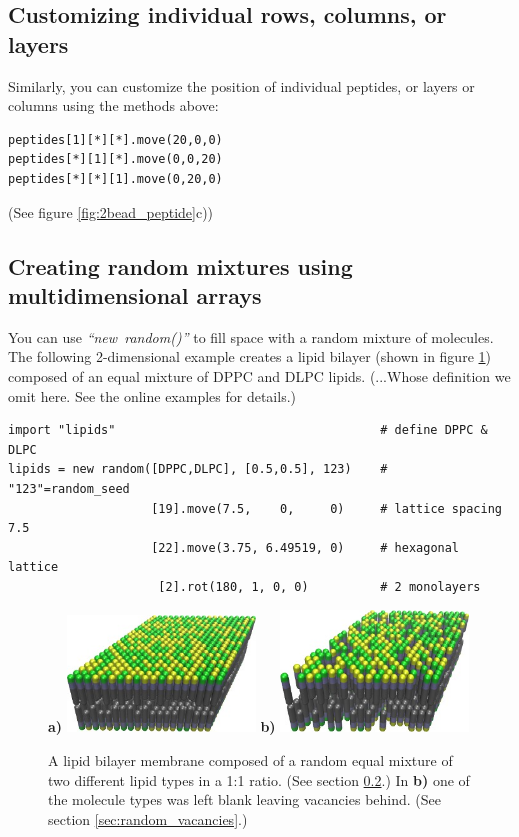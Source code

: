 \documentclass[11pt]{article}
\begin{document}
\subsection{Customizing individual rows, columns, or layers}
Similarly, you can customize the position of individual peptides, 
or layers or columns using the methods above:
\begin{verbatim}
peptides[1][*][*].move(20,0,0)
peptides[*][1][*].move(0,0,20)
peptides[*][*][1].move(0,20,0)
\end{verbatim}
(See figure \ref{fig:2bead_peptide}c))

\subsection{Creating random mixtures using multidimensional arrays}
\label{sec:random_advanced}
You can use \mbox{\textit{``new random()''}} to fill space with
a random mixture of molecules.  The following 2-dimensional example
creates a lipid bilayer (shown in figure \ref{fig:random_bilayer})
composed of an equal mixture of 
DPPC and DLPC lipids. (...Whose definition we omit here.  
See the online examples for details.)
\begin{verbatim}
import "lipids"                                     # define DPPC & DLPC
lipids = new random([DPPC,DLPC], [0.5,0.5], 123)    # "123"=random_seed
                    [19].move(7.5,    0,     0)     # lattice spacing 7.5
                    [22].move(3.75, 6.49519, 0)     # hexagonal lattice
                     [2].rot(180, 1, 0, 0)          # 2 monolayers
\end{verbatim}
\begin{figure}[htbp]
\centering
\textbf{a)}
\includegraphics[width=5cm]{lipid_bilayer_mixture_LR.jpg}
\hspace{0.5cm}
\textbf{b)}
\includegraphics[width=5cm]{lipid_bilayer_vacancies_LR.jpg}
\caption{
\label{fig:random_bilayer}
A lipid bilayer membrane composed of a random equal mixture of
two different lipid types in a 1:1 ratio.
(See section \ref{sec:random_advanced}.)
In \textbf{b)} one of the molecule types was left blank
leaving vacancies behind.  
(See section \ref{sec:random_vacancies}.)
}
\end{figure}
\end{document}
